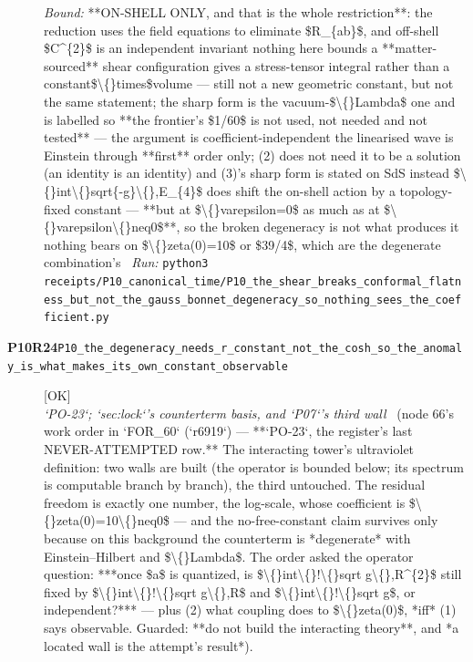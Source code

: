\begin{description}
 \emph{Bound:}  **ON-SHELL ONLY, and that is the whole restriction**: the reduction uses the field equations to eliminate \$R\_\{ab\}\$, and off-shell \$C\textasciicircum{}\{2\}\$ is an independent invariant nothing here bounds  a **matter-sourced** shear configuration gives a stress-tensor integral rather than a constant\$\textbackslash\{\}times\$volume --- still not a new geometric constant, but not the same statement; the sharp form is the vacuum-\$\textbackslash\{\}Lambda\$ one and is labelled so  **the frontier's \$1/60\$ is not used, not needed and not tested** --- the argument is coefficient-independent  the linearised wave is Einstein through **first** order only; (2) does not need it to be a solution (an identity is an identity) and (3)'s sharp form is stated on SdS instead  \$\textbackslash\{\}int\textbackslash\{\}sqrt\{-g\}\textbackslash\{\},E\_\{4\}\$ does shift the on-shell action by a topology-fixed constant --- **but at \$\textbackslash\{\}varepsilon=0\$ as much as at \$\textbackslash\{\}varepsilon\textbackslash\{\}neq0\$**, so the broken degeneracy is not what produces it  nothing bears on \$\textbackslash\{\}zeta(0)=10\$ or \$39/4\$, which are the degenerate combination's
\ \emph{Run:} \texttt{python3 receipts/P10\_canonical\_time/P10\_the\_shear\_breaks\_conformal\_flatness\_but\_not\_the\_gauss\_bonnet\_degeneracy\_so\_nothing\_sees\_the\_coefficient.py}
\item[\rcptlabel{P10_the_degeneracy_needs_r_constant_not_the_cosh_so_the_anomaly_is_what_makes_its_own_constant_observable}{P10R24}\textbf{P10R24}\quad\texttt{P10\_the\_degeneracy\_needs\_r\_constant\_not\_the\_cosh\_so\_the\_anomaly\_is\_what\_makes\_its\_own\_constant\_observable}]\hfill\textsf{[OK]}\\
\textit{`PO-23`; `sec:lock`'s counterterm basis, and `P07`'s third wall} \ (node 66's work order in `FOR\_60` (`r6919`) --- **`PO-23`, the register's last NEVER-ATTEMPTED row.** The interacting tower's ultraviolet definition: two walls are built (the operator is bounded below; its spectrum is computable branch by branch), the third untouched. The residual freedom is exactly one number, the log-scale, whose coefficient is \$\textbackslash\{\}zeta(0)=10\textbackslash\{\}neq0\$ --- and the no-free-constant claim survives only because on this background the counterterm is *degenerate* with Einstein--Hilbert and \$\textbackslash\{\}Lambda\$. The order asked the operator question: ***once \$a\$ is quantized, is \$\textbackslash\{\}int\textbackslash\{\}!\textbackslash\{\}sqrt g\textbackslash\{\},R\textasciicircum{}\{2\}\$ still fixed by \$\textbackslash\{\}int\textbackslash\{\}!\textbackslash\{\}sqrt g\textbackslash\{\},R\$ and \$\textbackslash\{\}int\textbackslash\{\}!\textbackslash\{\}sqrt g\$, or independent?*** --- plus (2) what coupling does to \$\textbackslash\{\}zeta(0)\$, *iff* (1) says observable. Guarded: **do not build the interacting theory**, and *a located wall is the attempt's result*). 

\end{description}
